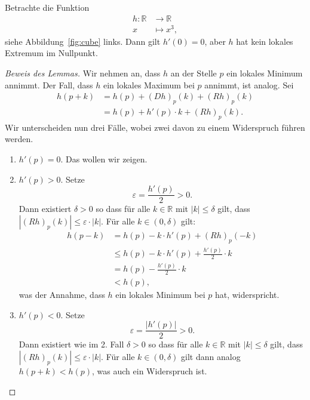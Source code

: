 \documentclass[../main.tex]{subfiles}
\begin{document}
\begin{example}
  Betrachte die Funktion
  \begin{align*}
    h \colon \mathbb{R} & \to \mathbb{R} \\
    x & \mapsto x^3,
  \end{align*}
  siehe Abbildung~\ref{fig:cube} links.
  Dann gilt $h'(0) = 0$, aber $h$
  hat kein lokales Extremum im Nullpunkt.
\end{example}

\begin{proof}[Beweis des Lemmas]
  Wir nehmen an, dass $h$ an der Stelle
  $p$ ein lokales Minimum annimmt. Der Fall,
  dass $h$ ein lokales Maximum bei $p$ annimmt,
  ist analog.
  Sei
  \begin{align*}
    h(p+k)
    & = h(p) + {(Dh)}_p(k) + {(Rh)}_p(k)\\
    & = h(p) + h'(p) \cdot k + {(Rh)}_p(k).
  \end{align*}
  Wir unterscheiden nun drei Fälle,
  wobei zwei davon zu einem Widerspruch führen werden.
  \begin{enumerate}[(1)]
    \item $h'(p) = 0$. Das wollen wir zeigen.
    \item $h'(p) > 0$. Setze
      \[
        \varepsilon = \frac{h'(p)}{2} > 0.
      \]
      Dann existiert $\delta > 0$ so dass
      für alle $k \in \mathbb{R}$ mit
      $|k| \leq \delta$ gilt, dass
      $|{(Rh)}_p(k)| \leq \varepsilon \cdot |k|$.
      Für alle $k \in (0, \delta)$ gilt:
      \begin{align*}
        h(p-k)
        &= h(p) - k \cdot h'(p) + {(Rh)}_p(-k)\\
        &\leq h(p) - k \cdot h'(p) + \frac{h'(p)}{2} \cdot k \\
        &= h(p) - \frac{h'(p)}{2} \cdot k \\
        &< h(p),
      \end{align*}
      was der Annahme, dass $h$ ein lokales Minimum bei $p$
      hat, widerspricht.
    \item $h'(p) < 0$.
      Setze 
      \[
        \varepsilon = \frac{|h'(p)|}{2} > 0.
      \]
      Dann existiert wie im 2. Fall $\delta > 0$ so dass
      für alle $k \in \mathbb{R}$ mit
      $|k| \leq \delta$ gilt, dass
      $|{(Rh)}_p(k)| \leq \varepsilon \cdot |k|$.
      Für alle $k \in (0, \delta)$ gilt dann
      analog
      $h(p + k) < h(p)$, was auch ein Widerspruch ist. \qedhere
  \end{enumerate}
\end{proof}
\end{document}

